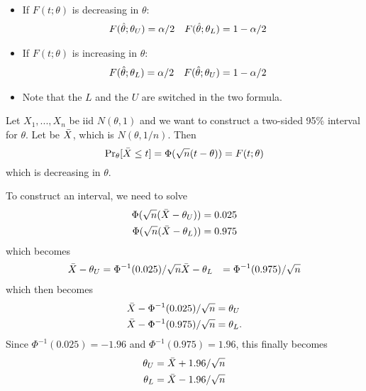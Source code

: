 \begin{itemize}[leftmargin=0pt]
  \begin{itemize}
  \item If $F(t; \theta)$ is decreasing in $\theta$:
    \begin{align*}
      F(\hat{\theta}; \theta_U) &= \alpha/2 & F(\hat{\theta}; \theta_L) &= 1 - \alpha/2
    \end{align*}
  \item If $F(t; \theta)$ is increasing in $\theta$:
    \begin{align*}
      F(\hat{\theta}; \theta_L) &= \alpha/2 & F(\hat{\theta}; \theta_U) &= 1 - \alpha/2
    \end{align*}
  \item Note that the $L$ and the $U$ are switched in the two formula.
  \end{itemize}

  \begin{ex} Let $X_1,...,X_n$ be iid $N(\theta, 1)$ and we want to
    construct a two-sided 95\% interval for $\theta$.  Let be $\bar{X}$, which
    is $N(\theta, 1/n)$.  Then
    \begin{equation*}
      \operatorname{Pr}_\theta[\bar{X} \leq t] = \Phi(\sqrt{n} (t - \theta)) = F(t; \theta)
    \end{equation*}
    which is decreasing in $\theta$.

    To construct an interval, we need to solve
    \begin{align*}
      \Phi(\sqrt{n} (\bar{X} - \theta_U)) &= 0.025 \\
      \Phi(\sqrt{n} (\bar{X} - \theta_L)) &= 0.975
    \end{align*}
    which becomes
    \begin{align*}
      \bar{X} - \theta_U &= \Phi^{-1}(0.025) / \sqrt{n}
      \bar{X} - \theta_L &= \Phi^{-1}(0.975) / \sqrt{n}
    \end{align*}
    which then becomes
    \begin{align*}
      \bar{X} - \Phi^{-1}(0.025) / \sqrt{n} &= \theta_U \\
      \bar{X} - \Phi^{-1}(0.975) / \sqrt{n} &= \theta_L.
    \end{align*}
    Since $\Phi^{-1}(0.025) = -1.96$ and $\Phi^{-1}(0.975) = 1.96$, this
    finally becomes
    \begin{align*}
      \theta_U &= \bar{X} + 1.96 / \sqrt{n} \\
      \theta_L &= \bar{X} - 1.96 / \sqrt{n}
    \end{align*}
  \end{ex}

\end{itemize}

